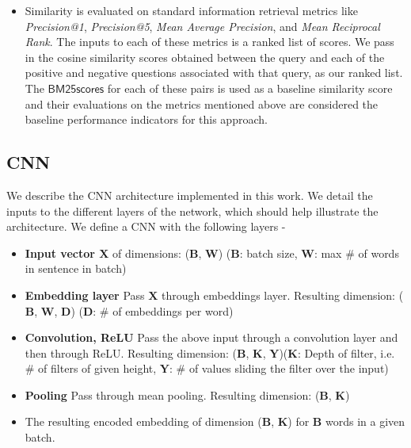 \documentclass{sigkddExp}
\begin{document}
\begin{itemize}[topsep=0pt,itemsep=-1ex,partopsep=1ex,parsep=1ex]
  \item Similarity is evaluated on standard information retrieval metrics like \textit{Precision@1}, \textit{Precision@5}, \textit{Mean Average Precision}, and \textit{Mean Reciprocal Rank}. The inputs to each of these metrics is a ranked list of scores. We pass in the cosine similarity scores obtained between the query and each of the positive and negative questions associated with that query, as our ranked list. The $\mathsf{BM25 scores}$ for each of these pairs is used as a baseline similarity score and their evaluations on the metrics mentioned above are considered the baseline performance indicators for this approach.
\end{itemize}

\subsection{CNN}
We describe the CNN architecture implemented in this work. We detail the inputs to the different layers of the network, which should help illustrate the architecture.
We define a CNN with the following layers -
\begin{itemize}[topsep=0pt,itemsep=-1ex,partopsep=1ex,parsep=1ex]
\item \textbf{Input vector $\mathbf{X}$} of dimensions: ($\mathbf{B}$, $\mathbf{W}$) ($\mathbf{B}$: batch size, $\mathbf{W}$: max \# of words in sentence in batch)
\item \textbf{Embedding layer} Pass $\mathbf{X}$ through embeddings layer. Resulting dimension: ($\mathbf{B}$, $\mathbf{W}$, $\mathbf{D}$) ($\mathbf{D}$: \# of embeddings per word)
\item \textbf{Convolution, ReLU} Pass the above input through a convolution layer and then through ReLU. Resulting dimension: ($\mathbf{B}$, $\mathbf{K}$, $\mathbf{Y}$)($\mathbf{K}$: Depth of filter, i.e. \# of filters of given height, $\mathbf{Y}$: \# of values sliding the filter over the input)
\item \textbf{Pooling} Pass through mean pooling. Resulting dimension: ($\mathbf{B}$, $\mathbf{K}$)
\item The resulting encoded embedding of dimension ($\mathbf{B}$, $\mathbf{K}$) for $\mathbf{B}$ words in a given batch.
\end{itemize}
\end{document}
